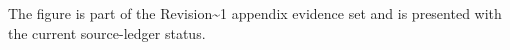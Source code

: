 The figure is part of the Revision\textasciitilde{}1 appendix evidence set and is presented with the current source-ledger status.
